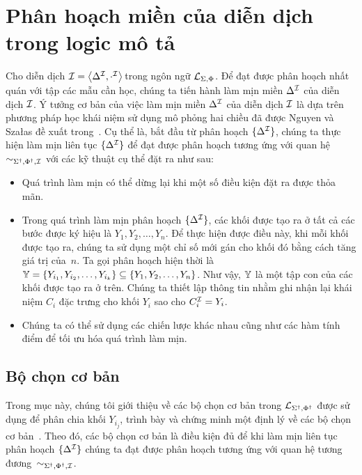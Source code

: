 \section{Phân hoạch miền của diễn dịch trong logic mô tả}

Cho diễn dịch $\mathcal{I} = \left\langle\Delta^{\mathcal{I}}, \cdot^{\mathcal{I}}\right\rangle\!$ trong ngôn ngữ $\mathcal{L}_{\Sigma,\Phi}$. Để đạt được phân hoạch nhất quán với tập các mẫu cần học, chúng ta tiến hành làm mịn miền $\Delta^{\mathcal{I}}$ của diễn dịch $\mathcal{I}$.
Ý tưởng cơ bản của việc làm mịn miền $\Delta^{\mathcal{I}}$ của diễn dịch $\mathcal{I}$ là dựa trên phương pháp học khái niệm sử dụng mô phỏng hai chiều đã được Nguyen và Sza{\l}as đề xuất trong~\cite{Nguyen2013}. Cụ thể là, bắt đầu từ phân hoạch $\{\Delta^{\mathcal{I}}\}$, chúng ta thực hiện làm mịn liên tục $\{\Delta^{\mathcal{I}}\}$ để đạt được phân hoạch tương ứng với quan hệ $\sim_{\Sigma^\dag,\Phi^\dag,\mathcal{I}}$ với các kỹ thuật cụ thể đặt ra như sau:
\begin{itemize}
	\item Quá trình làm mịn có thể dừng lại khi một số điều kiện đặt ra được thỏa mãn.		
	\item Trong quá trình làm mịn phân hoạch $\{\Delta^{\mathcal{I}}\}$, các khối được tạo ra ở tất cả các bước được ký hiệu là $Y_1, Y_2, \ldots, Y_n$. Để thực hiện được điều này, khi mỗi khối được tạo ra, chúng ta sử dụng một chỉ số mới gán cho khối đó bằng cách tăng giá trị của~$n$. Ta gọi phân hoạch hiện thời là $\mathbb{Y} = \{Y_{i_1}, Y_{i_2}, \ldots, Y_{i_k}\} \subseteq \{Y_1, Y_2, \ldots, Y_n\}$. Như vậy, $\mathbb{Y}$ là một tập con của các khối được tạo ra ở trên. Chúng ta thiết lập thông tin nhằm ghi nhận lại khái niệm $C_i$ đặc trưng cho khối $Y_i$ sao cho $C_i^{\mathcal{I}} = Y_i$.
	\item Chúng ta có thể sử dụng các chiến lược khác nhau cũng như các hàm tính điểm để tối ưu hóa quá trình làm mịn.
\end{itemize}

\subsection{Bộ chọn cơ bản}
\label{sec:Chap3.BasicSelectors}
Trong mục này, chúng tôi giới thiệu về các bộ chọn cơ bản trong $\mathcal{L}_{\Sigma^\dag,\Phi^\dag}$ được sử dụng để phân chia khối $Y_{i_j}$, trình bày và chứng minh một định lý về các bộ chọn cơ bản~\cite{Tran2012}. Theo đó, các bộ chọn cơ bản là điều kiện đủ để khi làm mịn liên tục phân hoạch $\{\Delta^{\mathcal{I}}\}$ chúng ta đạt được phân hoạch tương ứng với quan hệ tương đương~$\sim_{\Sigma^\dag,\Phi^\dag,\mathcal{I}}$.
%

